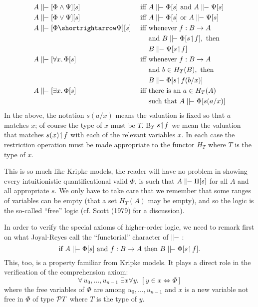 \begin{align*}
  A & \mm [\Phi \land \Psi] [s] & {\textrm{ iff }} & A \mm \Phi[s] \textrm{ and } A \mm \Psi[s]\\
  A & \mm [\Phi \lor \Psi] [s] & {\textrm{ iff }} & A \mm \Phi[s] \textrm{ or } A \mm \Psi[s]\\
  A & \mm [\Phi \imp \Psi] [s] & {\textrm{ iff }} & \textrm{whenever } f:\BA\\
  &&& \textrm{and } B \mm \Phi[s \res f], \textrm{ then} \\
  &&& B \mm \Psi[s \res f]\\
  A & \mm [\forall x.\, \Phi [s] & {\textrm{ iff }} & \textrm{whenever } f:\BA\\
  &&& \textrm{and } b \in H_{T}(B), \textrm{ then} \\
  &&& B \mm \Phi[s \res f (b/x)]\\
  A & \mm [\exists x.\, \Phi [s] & {\textrm{ iff }} & \textrm{there is an } a \in H_T(A)\\
  &&& \textrm{such that } A \mm \Phi[s(a/x)]
\end{align*}
In the above, the notation $s(a/x)$ means the valuation is fixed
so that $a$ matches $x$; of course the type of $x$ must be $T$. By $s \res f$ we mean the valuation that matches $s(x)\res f$ with each of the relevant variables $x$. In each case the restriction operation must be made appropriate to the functor $H_T$ where $T$ is the type of $x$.

This is so much like Kripke models, the reader will have no problem in showing every intuitionistic quantificational valid $\Phi$, is such that $A \mm \Pi[s]$ for all $A$ and all appropriate $s$. We only have to take care that we remember that some ranges of variables can be empty (that a set $H_T(A)$ may be empty), and so the logic is the so-called ``free'' logic (cf. Scott (1979) for a discussion).

In order to verify the special axioms of higher-order logic, we need to remark first on what Joyal-Reyes call the ``functorial'' character of $\mm$ :
$$
\textrm{if } A\mm\Phi[s] \textrm{ and } f:\BA \textrm{ then } B \mm \Phi[s \res f] .
$$
This, too, is a property familiar from Kripke models. It plays a direct role in the verification of the comprehension axiom:
$$
\forall\, u_0, \dots, u_{n-1} \,\, \exists x \forall y .\,\,  [ y \in x \iff \Phi]
$$
where the free variables of $\Phi$ are among $u_0, \dots, u_{n-1}$ and $x$ is a new variable not free in $\Phi$ of type $\P T$ where $T$ is the type of $y$.


